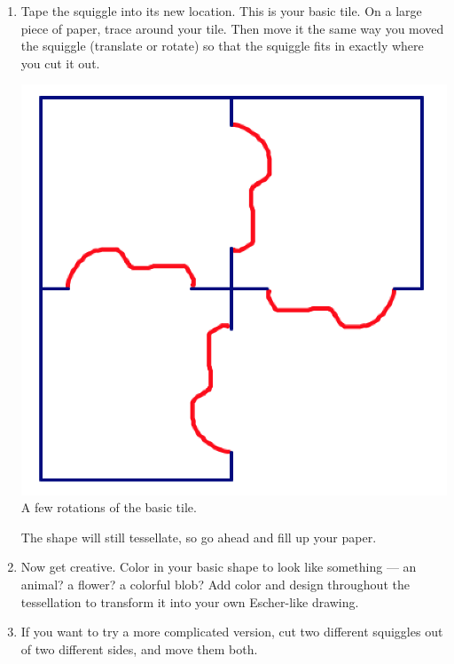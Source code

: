 \documentclass[12pt, reqno]{amsart}
\theoremstyle{remark}
\theoremstyle{definition}
\numberwithin{equation}{section}  %
\begin{document}
\begin{enumerate}
\item
Tape the squiggle into its new location.  This is your basic tile.  On a large piece of paper, trace around your  tile.  Then move it the same way you moved the squiggle (translate or rotate) so that the squiggle fits in exactly where you cut it out.

\begin{center}
\includegraphics[scale=0.5]{eschdirect4}\\
A few rotations of the basic tile.

\end{center}
The shape will still tessellate, so go ahead and fill up your paper.\\


\item
Now get creative.  Color in your basic shape to look like something --- an animal?  a flower?  a colorful blob?  Add color and design throughout the tessellation to transform it into your own Escher-like drawing.\\

\item
If you want to try a more complicated version, cut two different squiggles out of two different sides, and move them both.  

\end{enumerate}
\end{document}
